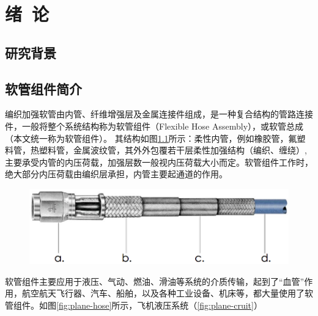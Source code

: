 


\chapter{绪~论}
\label{chap:introduintroduction}
\section{研究背景}

\cite{Potluri2006}


\section{软管组件简介}
编织加强软管由内管、纤维增强层及金属连接件组成，是一种复合结构的管路连接件，一般将整个系统结构称为软管组件（Flexible Hose Assembly），或软管总成（本文统一称为软管组件）。
其结构如图\ref{fig:hose structure}所示：柔性内管，例如橡胶管，氟塑料管，热塑料管，金属波纹管，其外外包覆若干层柔性加强结构（编织、缠绕）,主要承受内管的内压荷载，加强层数一般视内压荷载大小而定。软管组件工作时，绝大部分内压荷载由编织层承担，内管主要起通道的作用。


\begin{figure}[!htbp]
\centering
\includegraphics[width=0.6\linewidth]{figure/chap1/Hose-Structure}
\label{fig:hose structure}
\end{figure}


软管组件主要应用于液压、气动、燃油、滑油等系统的介质传输，起到了“血管”作用，航空航天飞行器、汽车、船舶，以及各种工业设备、机床等，都大量使用了软管组件。如图\ref{fig:plane-hose}所示，飞机液压系统（\ref{fig:plane-cruit}）



